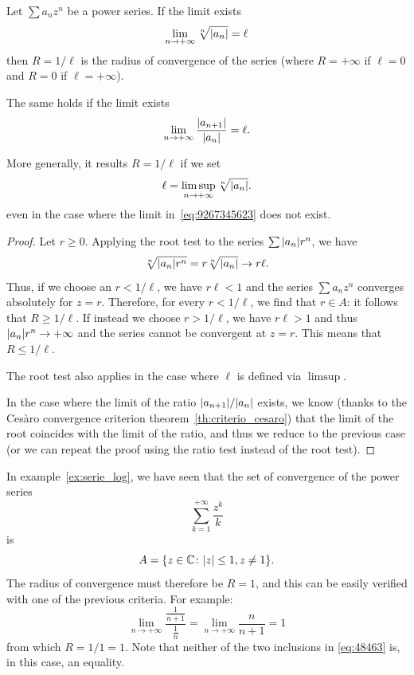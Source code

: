 \begin{theorem}
\mymark{***}
\label{th:calcolo_raggio_convergenza}
Let $\sum a_n z^n$ be a power series. If the limit exists
\begin{equation}\label{eq:9267345623}
  \lim_{n\to+\infty}\sqrt[n]{{\left|a_n\right|}} =\ell
\end{equation}
then $R=1/\ell$ is the radius of convergence of the series
(where $R=+\infty$ if $\ell = 0$ and $R=0$ if $\ell=+\infty$).

The same holds if the limit exists
\[
  \lim_{n\to +\infty} \frac{{\left|a_{n+1}\right|}}{{\left|a_n\right|}} = \ell.
\]

More generally, it results $R=1/\ell$ if we set
\[
   \ell = \limsup_{n\to +\infty} \sqrt[n]{{\left|a_n\right|}}.
\]
even in the case where the limit in~\eqref{eq:9267345623}
does not exist.
\end{theorem}
%
\begin{proof}
\mymark{***}
Let $r\ge 0$.
Applying the root test to the series $\sum {\left|a_n\right|} r^n$, we have
\[
  \sqrt[n]{{\left|a_n\right|} r^n}
  = r \sqrt[n]{{\left|a_n\right|}} \to r\ell.
\]
Thus, if we choose an $r < 1/\ell$, we have $r \ell<1$ and the series
$\sum a_n z^n$ converges
absolutely for $z=r$.
Therefore, for every $r<1/\ell$,
we find that $r\in A$: it follows that $R\ge 1/\ell$.
If instead we choose $r > 1/\ell$, we have $r \ell > 1$ and thus
${\left|a_n\right|} r^n \to +\infty$ and the series cannot be convergent
at $z=r$. This means that $R\le 1/\ell$.

The root test also applies in the case where $\ell$ is defined
via $\limsup$.

In the case where the limit of the ratio ${\left|a_{n+1}\right|} / {\left|a_n\right|}$
exists, we know (thanks to the Cesàro convergence criterion
theorem~\ref{th:criterio_cesaro}) that
the limit of the root coincides with the limit of the ratio, and thus
we reduce to the previous case (or we can repeat the proof
using the ratio test instead of the root test).
\end{proof}

\begin{example}
In example~\ref{ex:serie_log}, we have seen
that the set of convergence of the power series
\[
  \sum_{k=1}^{+\infty} \frac{z^k}{k}
\]
is
\[
  A = {\left\{  z\in {\mathbb C} \colon {\left|z\right|}\le 1, z\neq 1 \right\}}.
\]
The radius of convergence must therefore be $R=1$, and this can be
easily verified with one of the previous criteria. For example:
\[
  \lim_{n\to+\infty} \frac{\frac{1}{n+1}}{\frac{1}{n}}
  = \lim_{n\to+\infty} \frac{n}{n+1} = 1
\]
from which $R=1/1=1$.
Note that neither of the two inclusions in \eqref{eq:48463}
is, in this case, an equality.
\end{example}

